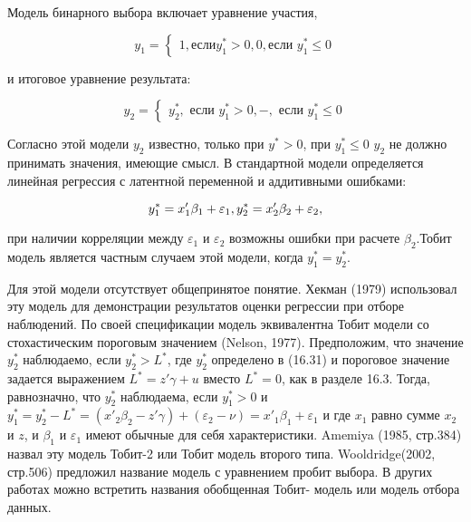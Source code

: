 Модель бинарного выбора включает уравнение участия,

\begin{equation}
y_1=
\begin{cases}
1,  \text{если} y_1^{*}>0,
0,  \text{если } y_1^{*}{\leq}0
\end{cases}
\end{equation}

и итоговое уравнение результата:

\begin{equation}
y_2=
\begin{cases}
y_2^{*},  \text{ если } y_1^{*}>0,
-,  \text{ если }y_1^{*}{\leq}0
\end{cases}
\end{equation}

Согласно этой модели $y_2$ известно, только при $y^{*}>0$, при $y^{*}_{1}{\leq}0$ $y_2$ не должно принимать значения, имеющие смысл. В стандартной модели определяется линейная регрессия с латентной переменной и аддитивными ошибками:

\begin{equation}
y_1^{*}=x'_{1}\beta_1+\varepsilon_1, \\
y_2^{*}=x'_{2}\beta_2+\varepsilon_{2},
\end{equation}

при наличии корреляции между $\varepsilon_1$ и $\varepsilon_2$ возможны ошибки при расчете $\beta_2$.Тобит модель является частным случаем этой модели, когда $y^{*}_1=y^{*}_2$.

Для этой модели отсутствует общепринятое понятие. Хекман (1979) использовал эту модель для демонстрации результатов оценки регрессии при отборе наблюдений. По своей спецификации модель эквивалентна Тобит модели со стохастическим пороговым значением (Nelson, 1977). Предположим, что значение $y^{*}_2$ наблюдаемо, если $y^{*}_{2}>L^{*}$, где $y^{*}_2$ определено в (16.31) и пороговое значение задается выражением $L^{*}=z'\gamma+u$ вместо $L^{*}=0$, как в разделе 16.3. Тогда, равнозначно, что $y^{*}_2$ наблюдаема, если $y^{*}_1>0$ и $y^{*}_{1}=y^{*}_{2}-L^{*}=(x'_2\beta_{2}-z'\gamma)+(\varepsilon_2-\nu)=x'_{1}\beta_{1}+\varepsilon_1$ и где $x_1$ равно сумме $x_2$ и $z$, и $\beta_1$ и $\varepsilon_1$ имеют обычные для себя характеристики. Amemiya (1985, стр.384) назвал эту модель Тобит-2 или Тобит модель второго типа. Wooldridge(2002, стр.506) предложил название модель с уравнением пробит выбора. В других работах можно встретить названия обобщенная Тобит- модель или модель отбора данных.

